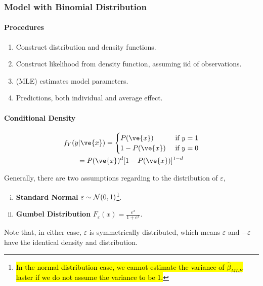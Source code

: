 \documentclass[11pt]{article}
\begin{document}
			\subsubsection{Model with Binomial Distribution}
				\paragraph{Procedures} \quad
					\begin{enumerate}
						\item Construct distribution and density functions.
						\item Construct likelihood from density function, assuming iid of observations.
						\item (MLE) estimates model parameters.
						\item Predictions, both individual and average effect.
					\end{enumerate}
				\paragraph{Conditional Density}
					\begin{gather}
						f_Y(y|\ve{x}) = \begin{cases}
							P(\ve{x}) &\tx{ if } y = 1 \\
							1 - P(\ve{x}) &\tx{ if } y = 0
						\end{cases} \\
						= P(\ve{x})^{d} [1 - P(\ve{x})]^{1-d} 
					\end{gather}
					
				\begin{assumption}
					Generally, there are two assumptions regarding to the distribution of $\varepsilon$,
					\begin{enumerate}[(i)]
						\item \textbf{Standard Normal} $\varepsilon \sim \mathcal{{N}}(0, 1)$\footnote{\hl{In the normal distribution case, we cannot estimate the variance of $\hat{\beta}_{MLE}$ laster if we do not assume the variance to be 1.}}.
						\item \textbf{Gumbel Distribution} $F_\varepsilon(x) = \frac{e^x}{1 + e^x}$.
					\end{enumerate}
					Note that, in either case, $\varepsilon$ is symmetrically distributed, which means $\varepsilon$ and $-\varepsilon$ have the identical density and distribution.
				\end{assumption}
				
\end{document}
